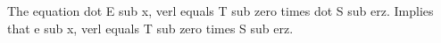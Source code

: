 The equation dot E sub x, verl equals T sub zero times dot S sub erz. Implies that e sub x, verl equals T sub zero times S sub erz.